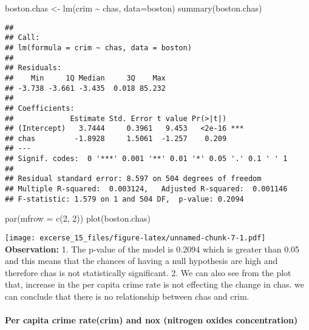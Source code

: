 \documentclass[
]{article}
\newenvironment{Shaded}{\begin{snugshade}}{\end{snugshade}}
\newcommand{\AttributeTok}[1]{\textcolor[rgb]{0.77,0.63,0.00}{#1}}
\newcommand{\DecValTok}[1]{\textcolor[rgb]{0.00,0.00,0.81}{#1}}
\newcommand{\FunctionTok}[1]{\textcolor[rgb]{0.00,0.00,0.00}{#1}}
\newcommand{\NormalTok}[1]{#1}
\newcommand{\OtherTok}[1]{\textcolor[rgb]{0.56,0.35,0.01}{#1}}
\newcommand{\SpecialCharTok}[1]{\textcolor[rgb]{0.00,0.00,0.00}{#1}}
\begin{document}
\begin{Shaded}
\begin{Highlighting}[]
\NormalTok{boston.chas }\OtherTok{\textless{}{-}} \FunctionTok{lm}\NormalTok{(crim }\SpecialCharTok{\textasciitilde{}}\NormalTok{ chas, }\AttributeTok{data=}\NormalTok{boston)}
\FunctionTok{summary}\NormalTok{(boston.chas)}
\end{Highlighting}
\end{Shaded}

\begin{verbatim}
## 
## Call:
## lm(formula = crim ~ chas, data = boston)
## 
## Residuals:
##    Min     1Q Median     3Q    Max 
## -3.738 -3.661 -3.435  0.018 85.232 
## 
## Coefficients:
##             Estimate Std. Error t value Pr(>|t|)    
## (Intercept)   3.7444     0.3961   9.453   <2e-16 ***
## chas         -1.8928     1.5061  -1.257    0.209    
## ---
## Signif. codes:  0 '***' 0.001 '**' 0.01 '*' 0.05 '.' 0.1 ' ' 1
## 
## Residual standard error: 8.597 on 504 degrees of freedom
## Multiple R-squared:  0.003124,   Adjusted R-squared:  0.001146 
## F-statistic: 1.579 on 1 and 504 DF,  p-value: 0.2094
\end{verbatim}

\begin{Shaded}
\begin{Highlighting}[]
\FunctionTok{par}\NormalTok{(}\AttributeTok{mfrow =} \FunctionTok{c}\NormalTok{(}\DecValTok{2}\NormalTok{, }\DecValTok{2}\NormalTok{))}
\FunctionTok{plot}\NormalTok{(boston.chas)}
\end{Highlighting}
\end{Shaded}

\texttt{[image: excerse\_15\_files/figure-latex/unnamed-chunk-7-1.pdf]}
\textbf{Observation:} 1. The p-value of the model is 0.2094 which is
greater than 0.05 and this means that the chances of having a null
hypothesis are high and therefore chas is not statistically significant.
2. We can also see from the plot that, increase in the per capita crime
rate is not effecting the change in chas. we can conclude that there is
no relationship between chas and crim.

\hypertarget{per-capita-crime-ratecrim-and-nox-nitrogen-oxides-concentration}{%
\paragraph{Per capita crime rate(crim) and nox (nitrogen oxides
concentration)}\label{per-capita-crime-ratecrim-and-nox-nitrogen-oxides-concentration}}
\end{document}
